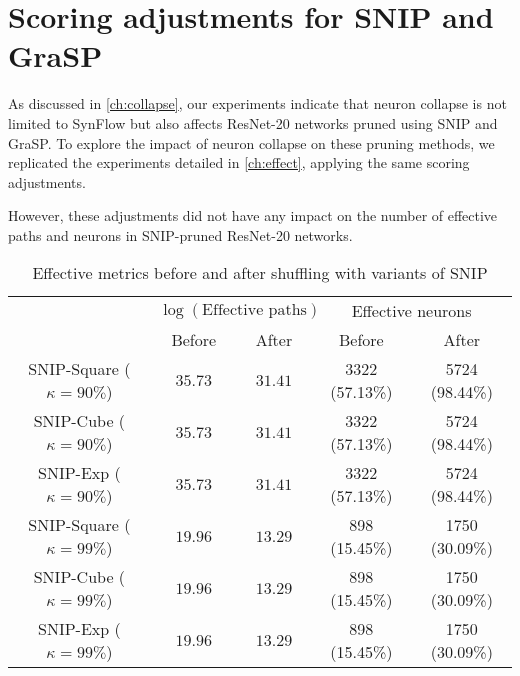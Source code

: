 \chapter{Scoring adjustments for SNIP and GraSP}
\label{append:adjustments}
\vspace*{1em}
As discussed in \autoref{ch:collapse}, our experiments indicate that neuron collapse is not limited to SynFlow but also affects ResNet-20 networks pruned using SNIP and GraSP. To explore the impact of neuron collapse on these pruning methods, we replicated the experiments detailed in \autoref{ch:effect}, applying the same scoring adjustments.

However, these adjustments did not have any impact on the number of effective paths and neurons in SNIP-pruned ResNet-20 networks.
\begin{table}[h!]
\centering
\begin{tabular}{|c|cc|cc|}
\hline
        & \multicolumn{2}{c|}{$\log(\text{Effective paths})$} & \multicolumn{2}{c|}{Effective neurons} \\ \cline{2-5} 
        & Before            & After            & Before             & After             \\ \hline
SNIP-Square ($\kappa=90\%$)   & $35.73$         & $31.41$        & 3322 (57.13\%)      & 5724 (98.44\%)    \\ \hline
SNIP-Cube  ($\kappa=90\%$)   & $35.73$         & $31.41$        & 3322 (57.13\%)      & 5724 (98.44\%)    \\ \hline
SNIP-Exp ($\kappa=90\%$)  & $35.73$         & $31.41$        & 3322 (57.13\%)      & 5724 (98.44\%)  \\ \hline
SNIP-Square ($\kappa=99\%$)   & $19.96$         & $13.29$        & 898 (15.45\%)      & 1750 (30.09\%)    \\ \hline
SNIP-Cube  ($\kappa=99\%$)  & $19.96$         & $13.29$        & 898 (15.45\%)      & 1750 (30.09\%)    \\ \hline
SNIP-Exp ($\kappa=99\%$)  & $19.96$         & $13.29$        & 898 (15.45\%)      & 1750 (30.09\%)  \\ \hline
\end{tabular}
\caption{Effective metrics before and after shuffling with variants of SNIP}
\label{table:snip-variants}
\end{table}


